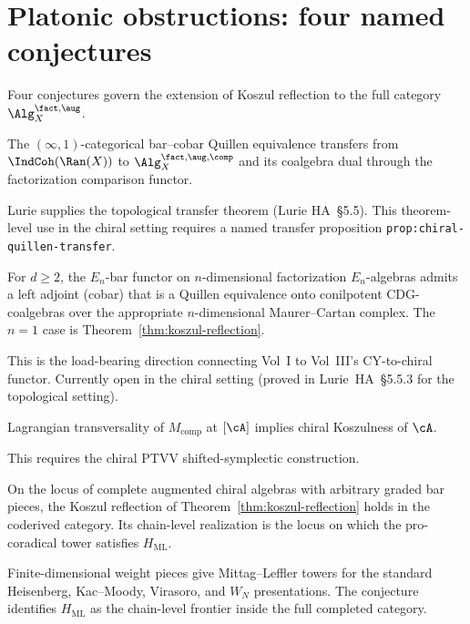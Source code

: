 \section{Platonic obstructions: four named conjectures}\label{sec:ainf2-platonic-obstructions}

Four conjectures govern the extension of Koszul reflection to the full
category $\Alg^{\fact,\aug}_X$.

\begin{conjecture}
\label{conj:fg-transfer}
\ClaimStatusConjectured
The $(\infty,1)$-categorical bar--cobar Quillen equivalence transfers
from $\IndCoh(\Ran(X))$ to $\Alg^{\fact,\aug,\comp}_X$ and its
coalgebra dual through the factorization comparison functor.
\end{conjecture}
Lurie supplies the topological transfer theorem
\textup{(}Lurie HA~\S5.5\textup{)}. This
theorem-level use in the chiral setting requires a named transfer
proposition \texttt{prop:chiral-quillen-transfer}.

\begin{conjecture}
\label{conj:en-bar-cobar-higher-d}
\ClaimStatusConjectured
For $d\geq 2$, the $E_n$-bar functor on $n$-dimensional factorization
$E_n$-algebras admits a left adjoint (cobar) that is a Quillen
equivalence onto conilpotent CDG-coalgebras over the appropriate
$n$-dimensional Maurer--Cartan complex. The $n=1$ case is
Theorem~\ref{thm:koszul-reflection}.
\end{conjecture}
This is the load-bearing direction connecting Vol~I to Vol~III's
CY-to-chiral functor. Currently open in the chiral setting (proved in
Lurie~HA~\S5.5.3 for the topological setting).

\begin{conjecture}
\label{conj:lagrangian-koszul-converse}
\ClaimStatusConjectured
Lagrangian transversality of $M_{\mathrm{comp}}$ at $[\cA]$ implies
chiral Koszulness of $\cA$.
\end{conjecture}
This requires the chiral PTVV shifted-symplectic construction.

\begin{conjecture}
\label{conj:unbounded-rank-koszul-reflection}
\ClaimStatusConjectured
On the locus of complete augmented chiral algebras with
arbitrary graded bar pieces, the Koszul reflection of
Theorem~\ref{thm:koszul-reflection} holds in the coderived category.
Its chain-level realization is the locus on which the pro-coradical
tower satisfies $H_{\mathrm{ML}}$.
\end{conjecture}
Finite-dimensional weight pieces give Mittag--Leffler towers for the
standard Heisenberg, Kac--Moody, Virasoro, and $W_N$ presentations.
The conjecture identifies $H_{\mathrm{ML}}$ as the chain-level frontier
inside the full completed category.

